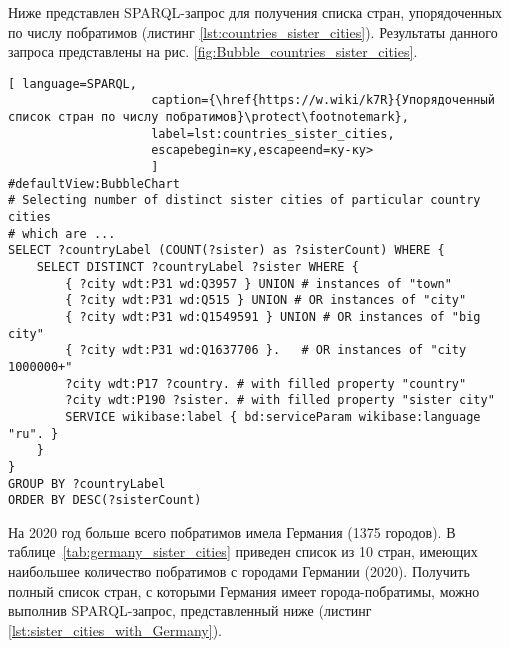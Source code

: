 
Ниже представлен SPARQL-запрос для получения списка стран, упорядоченных по числу побратимов (листинг \ref{lst:countries_sister_cities}). Результаты данного запроса представлены на рис. \ref{fig:Bubble_countries_sister_cities}.

\begin{lstlisting}[ language=SPARQL, 
                    caption={\href{https://w.wiki/k7R}{Упорядоченный список стран по числу побратимов}\protect\footnotemark},
                    label=lst:countries_sister_cities, 
                    escapebegin=ку,escapeend=ку-ку>
                    ]
#defaultView:BubbleChart
# Selecting number of distinct sister cities of particular country cities 
# which are ... 
SELECT ?countryLabel (COUNT(?sister) as ?sisterCount) WHERE { 
	SELECT DISTINCT ?countryLabel ?sister WHERE {
		{ ?city wdt:P31 wd:Q3957 } UNION # instances of "town"
		{ ?city wdt:P31 wd:Q515 } UNION # OR instances of "city"
		{ ?city wdt:P31 wd:Q1549591 } UNION # OR instances of "big city"
		{ ?city wdt:P31 wd:Q1637706 }.	 # OR instances of "city 1000000+"
		?city wdt:P17 ?country. # with filled property "country"
		?city wdt:P190 ?sister. # with filled property "sister city"
		SERVICE wikibase:label { bd:serviceParam wikibase:language "ru". }
	}                                 
}
GROUP BY ?countryLabel
ORDER BY DESC(?sisterCount)
\end{lstlisting}

На 2020 год больше всего побратимов имела Германия (\num{1375} городов). В таблице~\ref{tab:germany_sister_cities} приведен список из 10 стран, имеющих наибольшее количество побратимов с городами Германии (2020). Получить полный список стран, с которыми Германия имеет города-побратимы, можно выполнив SPARQL-запрос, представленный ниже (листинг \ref{lst:sister_cities_with_Germany}).

